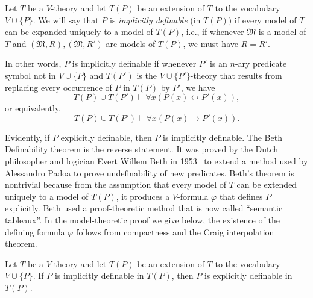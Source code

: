 \documentclass{scrartcl}
\renewcommand{\phi}{\varphi}
\newcommand{\FM}{\mathfrak{M}}
\begin{document}
\begin{definition}
Let $T$ be a $V$-theory and let $T(P)$ be an extension of $T$ to the vocabulary $V\cup\{P\}$.
We will say that $P$ is \emph{implicitly definable} 
(in $T(P))$ if every model of $T$ can be expanded uniquely to a model of $T(P)$, i.e., if whenever $\FM$ is a model of $T$ and $(\FM, R), (\FM, R')$ are models of $T(P)$, we must have $R=R'$. 

In other words, $P$ is implicitly definable if whenever $P'$ is an $n$-ary predicate symbol not in $V\cup\{P\}$ and $T(P')$ is the $V\cup\{P'\}$-theory that results from replacing every occurrence of $P$ in $T(P)$ by $P'$, we have
\[
T(P)\cup T(P')\models 
\forall\bar{x}(P(\bar{x})\leftrightarrow P'(\bar{x})),
\] 
or equivalently,
\[
T(P)\cup T(P')\models 
\forall\bar{x}(P(\bar{x})\to P'(\bar{x})).
\]
\end{definition}

\begin{history}
Evidently, if $P$ explicitly definable, then $P$ is implicitly definable. The Beth Definability theorem is the reverse statement. It was proved by the Dutch philosopher and logician Evert Willem Beth in 1953~\cite{Beth:1953} to extend a method used by Alessandro Padoa to prove undefinability of new predicates. Beth's theorem is nontrivial because from the assumption that every model of $T$ can be extended uniquely to a model of $T(P)$, it produces a $V$-formula $\phi$ that defines $P$ explicitly. Beth used a proof-theoretic method that is now called ``semantic tableaux''. In the model-theoretic proof we give below, the existence of the defining formula $\phi$ follows from compactness and the Craig interpolation theorem.
\end{history}



\begin{theorem}
Let $T$ be a $V$-theory and let $T(P)$ be an extension of $T$ to the vocabulary $V\cup\{P\}$.
If $P$ is implicitly definable in $T(P)$, then $P$ is explicitly definable in $T(P)$. 
\end{theorem}
\end{document}
